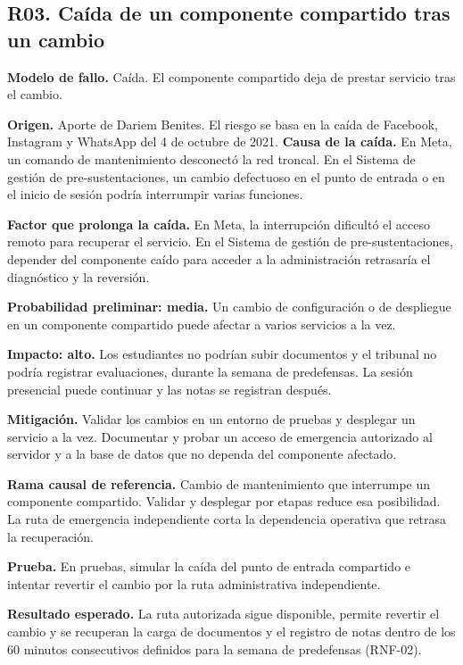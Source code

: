 \subsection{R03. Caída de un componente compartido tras un cambio}

\textbf{Modelo de fallo.} Caída. El componente compartido deja de prestar servicio tras el cambio.

\textbf{Origen.} Aporte de Dariem Benites. El riesgo se basa en la caída de Facebook, Instagram y WhatsApp del 4 de octubre de 2021.
\textbf{Causa de la caída.} En Meta, un comando de mantenimiento desconectó la red troncal. En el Sistema de gestión de pre-sustentaciones, un cambio defectuoso en el punto de entrada o en el inicio de sesión podría interrumpir varias funciones.

\textbf{Factor que prolonga la caída.} En Meta, la interrupción dificultó el acceso remoto para recuperar el servicio. En el Sistema de gestión de pre-sustentaciones, depender del componente caído para acceder a la administración retrasaría el diagnóstico y la reversión.

\textbf{Probabilidad preliminar: media.} Un cambio de configuración o de despliegue en un componente compartido puede afectar a varios servicios a la vez.

\textbf{Impacto: alto.} Los estudiantes no podrían subir documentos y el tribunal no podría registrar evaluaciones, durante la semana de predefensas. La sesión presencial puede continuar y las notas se registran después.

\textbf{Mitigación.} Validar los cambios en un entorno de pruebas y desplegar un servicio a la vez. Documentar y probar un acceso de emergencia autorizado al servidor y a la base de datos que no dependa del componente afectado.

\textbf{Rama causal de referencia.} Cambio de mantenimiento que interrumpe un componente compartido. Validar y desplegar por etapas reduce esa posibilidad. La ruta de emergencia independiente corta la dependencia operativa que retrasa la recuperación.

\textbf{Prueba.} En pruebas, simular la caída del punto de entrada compartido e intentar revertir el cambio por la ruta administrativa independiente.

\textbf{Resultado esperado.} La ruta autorizada sigue disponible, permite revertir el cambio y se recuperan la carga de documentos y el registro de notas dentro de los 60 minutos consecutivos definidos para la semana de predefensas (RNF-02).

